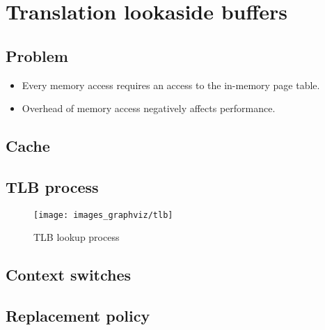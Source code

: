 \chapter{Translation lookaside buffers}
\label{ch:tlb}



\section{Problem}

\begin{itemize}
\item Every memory access requires an access to the in-memory page table.
\item Overhead of memory access negatively affects performance.
\end{itemize}

\section{Cache}

\section{TLB process}

\begin{figure}[htbp]
  \centering
  \texttt{[image: images\_graphviz/tlb]}
  \caption{TLB lookup process}
  \label{fig:tlb-lookup}
\end{figure}

\section{Context switches}

\section{Replacement policy}




